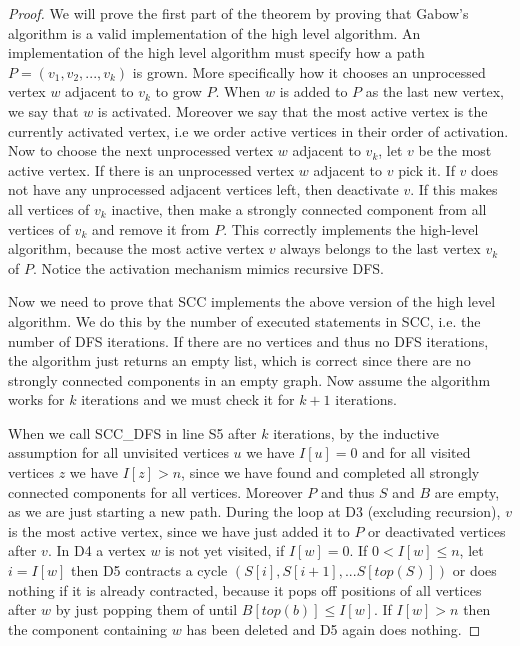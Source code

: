 \documentclass{report}
\theoremstyle{plain}
\theoremstyle{definition}
\theoremstyle{remark}
\numberwithin{definition}{chapter}
\numberwithin{example}{chapter}
\numberwithin{figure}{chapter}
\numberwithin{theorem}{chapter}
\numberwithin{lemma}{chapter}
\begin{document}
\begin{proof}
We will prove the first part of the theorem by proving that Gabow's algorithm is a valid implementation of the high level algorithm.
An implementation of the high level algorithm must specify how a path $P=(v_1,v_2,...,v_k)$ is grown. More specifically how it chooses an unprocessed vertex $w$ adjacent to $v_k$ to grow $P$. When $w$ is added to $P$ as the last new vertex, we say that $w$ is activated. Moreover we say that the most active vertex is the currently activated vertex, i.e we order active vertices in their order of activation. Now to choose the next unprocessed vertex $w$ adjacent to $v_k$, let $v$ be the most active vertex. If there is an unprocessed vertex $w$ adjacent to $v$ pick it. If $v$ does not have any unprocessed adjacent vertices left, then deactivate $v$. If this makes all vertices of $v_k$ inactive, then make a strongly connected component from all vertices of $v_k$ and remove it from $P$. This correctly implements the high-level algorithm, because the most active vertex $v$ always belongs to the last vertex $v_k$ of $P$. Notice the activation mechanism mimics recursive DFS.

Now we need to prove that SCC implements the above version of the high level algorithm. We do this by the number of executed statements in SCC, i.e. the number of DFS iterations. If there are no vertices and thus no DFS iterations, the algorithm just returns an empty list, which is correct since there are no strongly connected components in an empty graph. Now assume the algorithm works for $k$ iterations and we must check it for $k+1$ iterations.

When we call SCC\_DFS in line S5 after $k$ iterations, by the inductive assumption for all unvisited vertices $u$ we have $I[u]=0$ and for all visited vertices $z$ we have $I[z] > n$, since we have found and completed all strongly connected components for all vertices. Moreover $P$ and thus $S$ and $B$ are empty, as we are just starting a new path. During the loop at D3 (excluding recursion), $v$ is the most active vertex, since we have just added it to $P$ or deactivated vertices after $v$. In D4 a vertex $w$ is not yet visited, if $I[w]=0$. If $0 < I[w] \leq n$, let $i=I[w]$  then D5 contracts a cycle $(S[i],S[i+1],...S[top(S)])$ or does nothing if it is already contracted, because it pops off positions of all vertices after $w$ by just popping them of until $B[top(b)] \leq I[w]$. If $I[w] > n$ then the component containing $w$ has been deleted and D5 again does nothing.


\end{proof}
\end{document}

